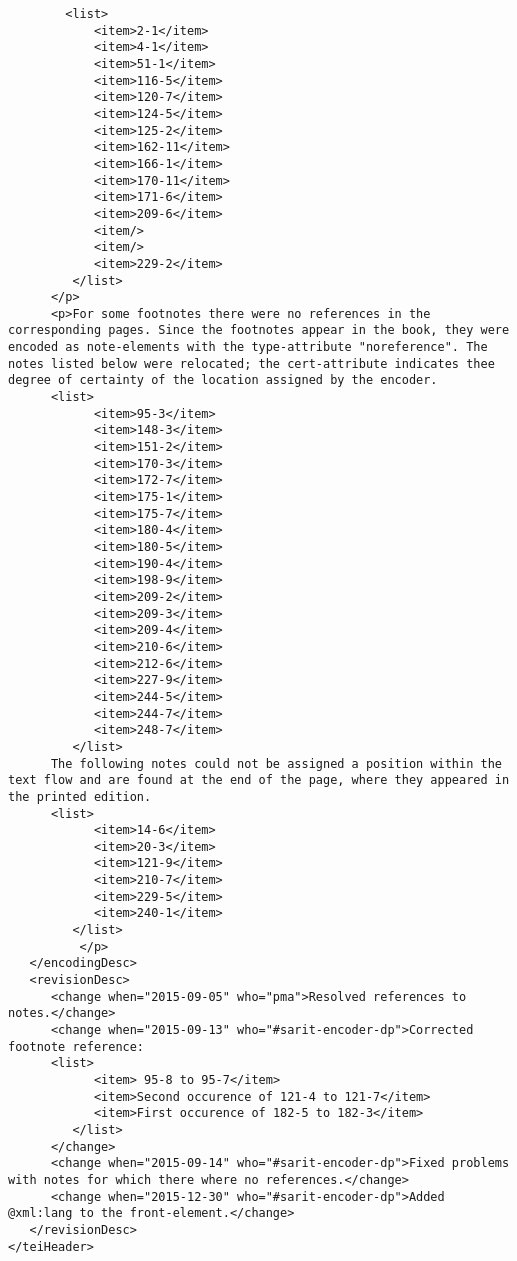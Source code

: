 \documentclass[article,12pt,a4paper]{memoir}
\begin{document}
\begin{verbatim}
    	<list>
            <item>2-1</item>
            <item>4-1</item>
            <item>51-1</item>
            <item>116-5</item>
            <item>120-7</item>
            <item>124-5</item>
            <item>125-2</item>
            <item>162-11</item>
            <item>166-1</item>
            <item>170-11</item>
            <item>171-6</item>
            <item>209-6</item>
            <item/>
            <item/>
            <item>229-2</item>
         </list>
      </p>
      <p>For some footnotes there were no references in the corresponding pages. Since the footnotes appear in the book, they were encoded as note-elements with the type-attribute "noreference". The notes listed below were relocated; the cert-attribute indicates thee degree of certainty of the location assigned by the encoder.
      <list>
            <item>95-3</item>
            <item>148-3</item>
            <item>151-2</item>
            <item>170-3</item>
            <item>172-7</item>
            <item>175-1</item>
            <item>175-7</item>
            <item>180-4</item>
            <item>180-5</item>
            <item>190-4</item>
            <item>198-9</item>
            <item>209-2</item>
            <item>209-3</item>
            <item>209-4</item>
            <item>210-6</item>
            <item>212-6</item>
            <item>227-9</item>
            <item>244-5</item>
            <item>244-7</item>
            <item>248-7</item>
         </list>
      The following notes could not be assigned a position within the text flow and are found at the end of the page, where they appeared in the printed edition.
      <list>
            <item>14-6</item>
            <item>20-3</item>
            <item>121-9</item>
            <item>210-7</item>
            <item>229-5</item>
            <item>240-1</item>
         </list>
          </p>
   </encodingDesc>
   <revisionDesc>
      <change when="2015-09-05" who="pma">Resolved references to notes.</change>
      <change when="2015-09-13" who="#sarit-encoder-dp">Corrected footnote reference:
      <list>
            <item> 95-8 to 95-7</item>
            <item>Second occurence of 121-4 to 121-7</item>
            <item>First occurence of 182-5 to 182-3</item>
         </list>
      </change>
      <change when="2015-09-14" who="#sarit-encoder-dp">Fixed problems with notes for which there where no references.</change>
      <change when="2015-12-30" who="#sarit-encoder-dp">Added @xml:lang to the front-element.</change>
   </revisionDesc>
</teiHeader>
	 \end{verbatim}
       
      \clearpage
      \begin{english}
      \printshorthands
      \printbibliography
      \end{english}
    
\end{document}
